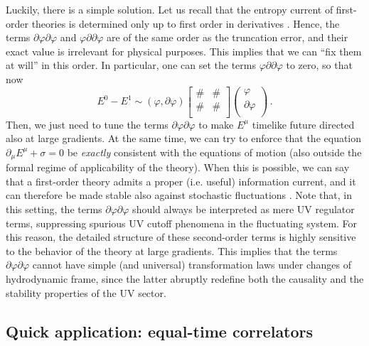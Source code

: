 \documentclass[a4paper, amsfonts, amssymb, amsmath, reprint, showkeys, nofootinbib, twoside,notitlepage,onecolumn,preprintnumbers]{revtex4-2}
\theoremstyle{definition}
\theoremstyle{theorem}
\theoremstyle{corollary}
\begin{document}
Luckily, there is a simple solution. Let us recall that the entropy current of first-order theories is determined only up to first order in derivatives \cite{Kovtun2019}. Hence, the terms $\partial \varphi \partial \varphi$ and $\varphi \partial \partial \varphi$ are of the same order as the truncation error, and their exact value is irrelevant for physical purposes. This implies that we can ``fix them at will'' in this order. In particular, one can set the terms $\varphi \partial \partial \varphi$ to zero, so that now
\begin{equation}\label{five}
E^0-E^1 \sim  (\varphi, \partial \varphi)
\begin{bmatrix}
\#  &  \# \\
\# &  \# \\
\end{bmatrix}
\begin{pmatrix}
\varphi \\
\partial \varphi \\
\end{pmatrix} \, .
\end{equation}
Then, we just need to tune the terms $\partial \varphi \partial \varphi$ to make $E^\mu$ timelike future directed also at large gradients. At the same time, we can try to enforce that the equation $\partial_\mu E^\mu +\sigma=0$ be \textit{exactly} consistent with the equations of motion (also outside the formal regime of applicability of the theory). When this is possible, we can say that a first-order theory admits a proper (i.e. useful) information current, and it can therefore be made stable also against stochastic fluctuations \cite{Mullins:2023tjg}. Note that, in this setting, the terms $\partial \varphi \partial \varphi$ should always be interpreted as mere UV regulator terms, suppressing spurious UV cutoff phenomena in the fluctuating system. For this reason, the detailed structure of these second-order terms is highly sensitive to the behavior of the theory at large gradients. This implies that the terms $\partial \varphi \partial \varphi$ cannot have simple (and universal) transformation laws under changes of hydrodynamic frame, since the latter abruptly redefine both the causality and the stability properties of the UV sector.

\subsection{Quick application: equal-time correlators}
\end{document}
